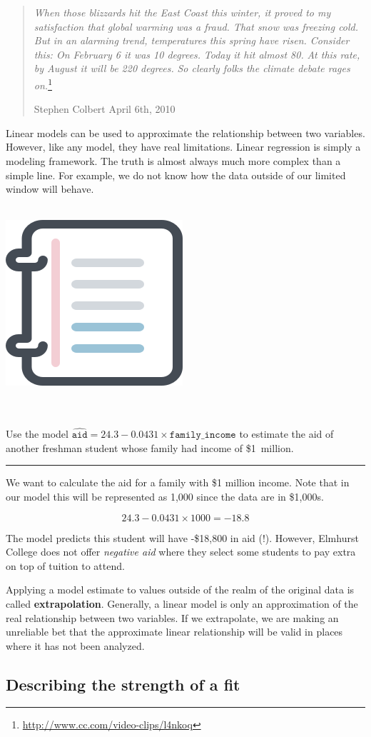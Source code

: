 \documentclass[
  10pt,
  openany]{book}
\newenvironment{mdframedwithfootGPWE}
{   
    \savenotes
    \begin{mdframed}[%
    topline=true, bottomline=true, linecolor=oiB, linewidth=0.5pt,
    rightline=false, leftline=false,
    backgroundcolor=oiLGray]
    \renewcommand{\thempfootnote}{\arabic{footnote}}
    }
{
    \end{mdframed}
    \spewnotes
}
\newenvironment{workedexample}{
    \let\oldrule\rule
    \renewcommand{\rule}[2]{\vspace{-2mm}\oldrule{##1}{##2}\vspace{-2mm}}
\vspace{4mm}
\begin{mdframedwithfootGPWE}
\begin{minipage}[t]{0.10\textwidth}
{$\:$ \\ \setkeys{Gin}{width=2.5em,keepaspectratio}\includegraphics{images/_icons/worked-example.png}}
\end{minipage}
\hfill
\begin{minipage}[t]{0.90\textwidth}
\vspace{-2mm}
\setlength{\parskip}{1em}
\noindent\textbf{\color{oiB}\small\fontfamily{phv}\selectfont{\MakeUppercase{Example}}} $\:$ \\ \\
}{\end{minipage}
\end{mdframedwithfootGPWE}
\vspace{4mm}
}
\begin{document}
\begin{quote}
\emph{When those blizzards hit the East Coast this winter, it proved to my satisfaction that global warming was a fraud. That snow was freezing cold. But in an alarming trend, temperatures this spring have risen. Consider this: On February 6 it was 10 degrees.} \emph{Today it hit almost 80.} \emph{At this rate, by August it will be 220 degrees.} \emph{So clearly folks the climate debate rages on.}\footnote{\url{http://www.cc.com/video-clips/l4nkoq}}

Stephen Colbert April 6th, 2010
\end{quote}

Linear models can be used to approximate the relationship between two variables.
However, like any model, they have real limitations.
Linear regression is simply a modeling framework.
The truth is almost always much more complex than a simple line.
For example, we do not know how the data outside of our limited window will behave.

\begin{workedexample}
Use the model \(\widehat{\texttt{aid}} = 24.3 - 0.0431 \times \texttt{family_income}\) to estimate the aid of another freshman student whose family had income of \$1~million.

\begin{center}\rule{0.5\linewidth}{0.5pt}\end{center}

We want to calculate the aid for a family with \$1 million income.
Note that in our model this will be represented as 1,000 since the data are in \$1,000s.

\[24.3 - 0.0431 \times 1000 = -18.8 \]

The model predicts this student will have -\$18,800 in aid (!).
However, Elmhurst College does not offer \emph{negative aid} where they select some students to pay extra on top of tuition to attend.

\end{workedexample}

Applying a model estimate to values outside of the realm of the original data is called \textbf{extrapolation}.
Generally, a linear model is only an approximation of the real relationship between two variables.
If we extrapolate, we are making an unreliable bet that the approximate linear relationship will be valid in places where it has not been analyzed.

\hypertarget{r-squared}{%
\subsection{Describing the strength of a fit}\label{r-squared}}
\end{document}
